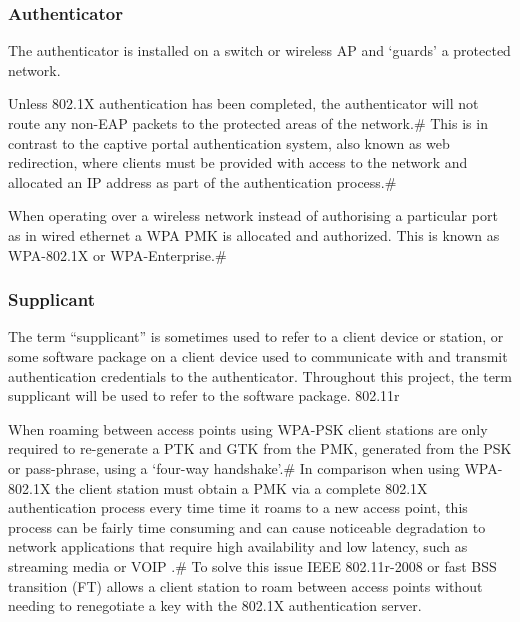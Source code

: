 \documentclass[pdftex, 12pt, a4paper]{article}
\begin{document}
\subsubsection{Authenticator}
The authenticator is installed on a switch or wireless AP and `guards' a protected network.

Unless 802.1X authentication has been completed, the authenticator will not route any non-EAP packets to the protected areas of the network.\# This is in contrast to the captive portal authentication system, also known as web redirection, where clients must be provided with access to the network and allocated an IP address as part of the authentication process.\#

When operating over a wireless network instead of authorising a particular port as in wired ethernet a WPA PMK is allocated and authorized.  This is known as WPA-802.1X or WPA-Enterprise.\#
\subsubsection{Supplicant}
The term ``supplicant'' is sometimes used to refer to a client device or station, or some software package on a client device used to communicate with and transmit authentication credentials to the authenticator.  Throughout this project, the term supplicant will be used to refer to the software package.
802.11r

When roaming between access points using WPA-PSK client stations are only required to re-generate a PTK and GTK from the PMK, generated from the PSK or pass-phrase, using a `four-way handshake'.\#  In comparison when using WPA-802.1X the client station must obtain a PMK via a complete 802.1X authentication process every time time it roams to a new access point, this process can be fairly time consuming and can cause noticeable degradation to network applications that require high availability and low latency, such as streaming media or VOIP .\#  To solve this issue IEEE 802.11r-2008 or fast BSS transition (FT) allows a client station to roam between access points without needing to renegotiate a key with the 802.1X authentication server.

\end{document}
